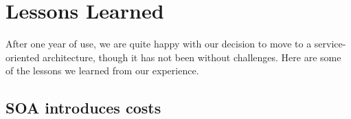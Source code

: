 \documentclass[conference,compsoc]{IEEEtran}
\begin{document}




\section{Lessons Learned}
\label{sec:conclusion}

After one year of use, we are quite happy with our decision to move to a
service-oriented architecture, though it has not been without
challenges. Here are some of the lessons we learned from our experience.

\subsection{SOA introduces costs}
\end{document}
